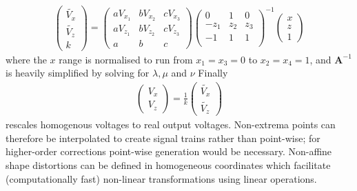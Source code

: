 \begin{align}
\begin{pmatrix}
\widetilde{V_x}  \\
\widetilde{V_z} \\
k
\end{pmatrix}=\begin{pmatrix}
 aV_{x_1} &  bV_{x_2} &  cV_{x_3} \\
 aV_{z_1} &  bV_{z_2} &  cV_{z_3} \\
 a & b  & c
\end{pmatrix}
\begin{pmatrix}
    0 & 1 & 0 \\
    -z_1 & z_2 & z_3 \\
    -1 & 1 & 1 \\
  \end{pmatrix}^{-1}
\begin{pmatrix}
x  \\
z \\
1
\end{pmatrix}
\end{align}
where the $x$ range is normalised to run from $x_1 = x_3 = 0$ to $x_2 =x_4=1$, and $\textbf{A}^{-1}$ is heavily simplified by solving for $ \lambda, \mu$ and $\nu$
Finally
\begin{align}
\begin{pmatrix}
V_x  \\
V_z
\end{pmatrix} =
\frac{1}{k}
\begin{pmatrix}
\widetilde{V_x}  \\
\widetilde{V_z}
\end{pmatrix}
\end{align}
rescales homogenous voltages to real output voltages.
Non-extrema points can therefore be interpolated to create signal trains rather than point-wise; for higher-order corrections point-wise generation would be necessary.
\if
Non-affine shape distortions can be defined in homogeneous coordinates which facilitate (computationally fast) %
non-linear transformations using linear operations.

